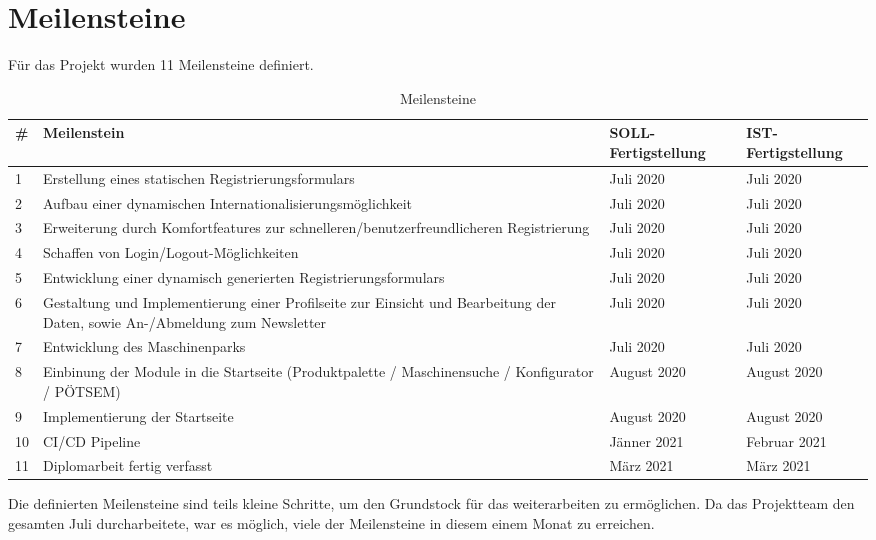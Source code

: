 \section{Meilensteine}
Für das Projekt wurden 11 Meilensteine definiert.\\
\begin{table}[H]
	\centering
{
\begin{tabular}[h]{|l|p{8cm}|p{2.5cm}|p{2.5cm}|}
	\hline
	\# & Meilenstein & SOLL-Fertigstellung & IST-Fertigstellung \\
	\hline
	1 & Erstellung eines statischen Registrierungsformulars & Juli 2020 & Juli 2020 \\
	\hline
	2 & Aufbau einer dynamischen Internationalisierungsmöglichkeit & Juli 2020 & Juli 2020 \\	
	\hline
	3 & Erweiterung durch Komfortfeatures zur schnelleren/benutzerfreundlicheren Registrierung & Juli 2020 & Juli 2020 \\
	\hline
	4 & Schaffen von Login/Logout-Möglichkeiten & Juli 2020 & Juli 2020 \\	
	\hline
	5 & Entwicklung einer dynamisch generierten Registrierungsformulars & Juli 2020 & Juli 2020 \\	
	\hline
	6 & Gestaltung und Implementierung einer Profilseite zur Einsicht und Bearbeitung der Daten, sowie An-/Abmeldung zum Newsletter & Juli 2020 & Juli 2020 \\	
	\hline
	7 & Entwicklung des Maschinenparks & Juli 2020 & Juli 2020 \\	
	\hline
	8 & Einbinung der Module in die Startseite (Produktpalette / Maschinensuche / Konfigurator / PÖTSEM) & August 2020 & August 2020 \\	
	\hline
	9 & Implementierung der Startseite & August 2020 & August 2020 \\	
	\hline
	10 & CI/CD Pipeline & Jänner 2021 & Februar 2021 \\	
	\hline	
	11 & Diplomarbeit fertig verfasst & März 2021 & März 2021 \\
	\hline
\end{tabular}
}
\caption{Meilensteine}
\end{table}
Die definierten Meilensteine sind teils kleine Schritte, um den Grundstock für das weiterarbeiten zu ermöglichen. Da das Projektteam den gesamten Juli durcharbeitete, war es möglich, viele der Meilensteine in diesem einem Monat zu erreichen. 

